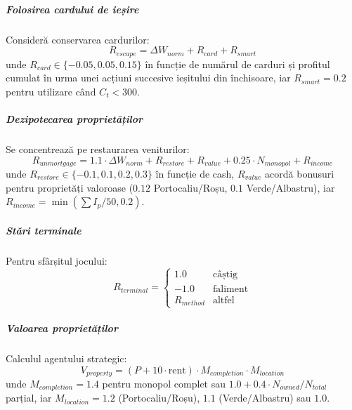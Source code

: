 \subparagraph{Folosirea cardului de ieșire} Consideră conservarea cardurilor:
\begin{equation}
R_{escape} = \Delta W_{norm} + R_{card} + R_{smart}
\end{equation}
unde $R_{card} \in \{-0.05, 0.05, 0.15\}$ în funcție de numărul de carduri și profitul cumulat în urma unei acțiuni succesive ieșitului din închisoare, iar $R_{smart} = 0.2$ pentru utilizare când $C_t < 300$.

\subparagraph{Dezipotecarea proprietăților} Se concentrează pe restaurarea veniturilor:
\begin{equation}
R_{unmortgage} = 1.1 \cdot \Delta W_{norm} + R_{restore} + R_{value} + 0.25 \cdot N_{monopol} + R_{income}
\end{equation}
unde $R_{restore} \in \{-0.1, 0.1, 0.2, 0.3\}$ în funcție de cash, $R_{value}$ acordă bonusuri pentru proprietăți valoroase ($0.12$ Portocaliu/Roșu, $0.1$ Verde/Albastru), iar $R_{income} = \min(\sum I_p / 50, 0.2)$.

\subparagraph{Stări terminale} Pentru sfârșitul jocului:
\begin{equation}
R_{terminal} = \begin{cases}
1.0 & \text{câștig} \\
-1.0 & \text{faliment} \\
R_{method} & \text{altfel}
\end{cases}
\end{equation}

\subparagraph{Valoarea proprietăților} Calculul agentului strategic:
\begin{equation}
V_{property} = (P + 10 \cdot \text{rent}) \cdot M_{completion} \cdot M_{location}
\end{equation}
unde $M_{completion} = 1.4$ pentru monopol complet sau $1.0 + 0.4 \cdot N_{owned}/N_{total}$ parțial, iar $M_{location} = 1.2$ (Portocaliu/Roșu), $1.1$ (Verde/Albastru) sau $1.0$.